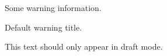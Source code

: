 \documentclass[DM,lsstdraft,authoryear,toc]{lsstdoc}
\begin{document}
\begin{warning}[Scary]
  Some warning information.
\end{warning}

\begin{warning}
  Default warning title.
\end{warning}

\begin{draftnote}
  This text should only appear in draft mode.
\end{draftnote}


\end{document}
